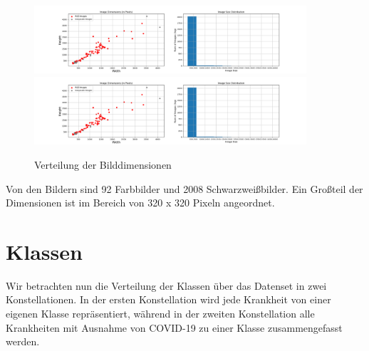 \begin{figure}[H]
	\centering
	\includegraphics[trim=110px 0 0.5\imagewidth{} 0, clip,width=0.9\textwidth]{../results/image_sizes.png}
	\includegraphics[trim=0.5\imagewidth{} 0 110px 0, clip,width=0.9\textwidth]{../results/image_sizes.png}
	\caption{Verteilung der Bilddimensionen}
\end{figure}

Von den Bildern sind 92 Farbbilder und 2008 Schwarzweißbilder. Ein Großteil der Dimensionen ist im Bereich von 320 x 320 Pixeln angeordnet.

\section{Klassen}

Wir betrachten nun die Verteilung der Klassen über das Datenset in zwei Konstellationen. In der ersten Konstellation wird jede Krankheit von einer eigenen Klasse repräsentiert, während in der zweiten Konstellation alle Krankheiten mit Ausnahme von COVID-19 zu einer Klasse zusammengefasst werden.


